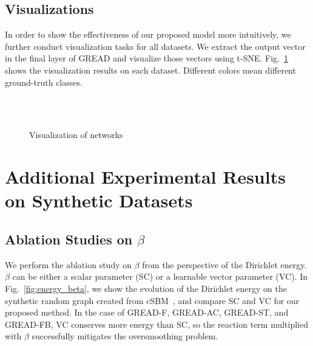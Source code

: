 \documentclass{article}
\theoremstyle{plain}
\theoremstyle{definition}
\theoremstyle{remark}
\begin{document}
\subsection{Visualizations}\label{a:visualization}
In order to show the effectiveness of our proposed model more intuitively, we further conduct visualization tasks for all datasets. We extract the output vector in the final layer of GREAD and visualize those vectors using t-SNE. Fig.~\ref{fig:networks} shows the visualization results on each dataset. Different colors mean different ground-truth classes.
 \begin{figure}[ht!]
    \centering
    \\
    \\
    \caption{Visualization of networks}
    \label{fig:networks}
 \end{figure}

\clearpage

\section{Additional Experimental Results on Synthetic Datasets}
\subsection{Ablation Studies on $\beta$}
We perform the ablation study on $\beta$ from the perspective of the Dirichlet energy. $\beta$ can be either a scalar parameter (SC) or a learnable vector parameter (VC). In Fig.~\ref{fig:energy_beta}, we show the evolution of the Dirichlet energy on the synthetic random graph created from cSBM~\cite{Deshpande2018cSBM}, and compare SC and VC for our proposed method. In the case of GREAD-F, GREAD-AC, GREAD-ST, and GREAD-FB, VC conserves more energy than SC, so the reaction term multiplied with $\beta$ successfully mitigates the oversmoothing problem.
\end{document}
